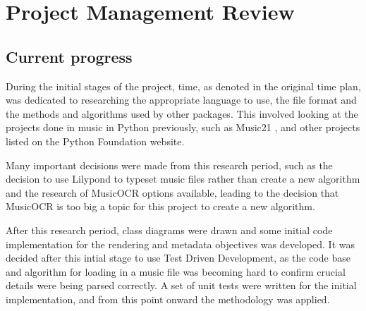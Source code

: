 \section{Project Management Review}
\subsection{Current progress}

During the initial stages of the project, time, as denoted in the original time plan, was dedicated to researching the appropriate language to use, the file format and the methods and algorithms used by other packages. This involved looking at the projects done in music in Python previously, such as Music21 \parencite{Music21}, and other projects listed on the Python Foundation website\parencite{pmus}. 

Many important decisions were made from this research period, such as the decision to use Lilypond to typeset music files rather than create a new algorithm and the research of MusicOCR options available, leading to the decision that MusicOCR is too big a topic for this project to create a new algorithm.


After this research period, class diagrams were drawn and some initial code implementation for the rendering and metadata objectives was developed. It was decided after this intial stage to use Test Driven Development, as the code base and algorithm for loading in a music file was becoming hard to confirm crucial details were being parsed correctly. A set of unit tests were written for the initial implementation, and from this point onward the methodology was applied.

